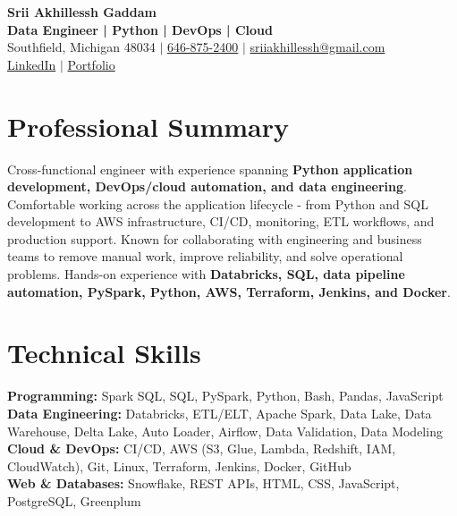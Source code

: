 \documentclass[letterpaper,10pt]{article}
\begin{document}
\fontsize{9.35pt}{10.45pt}\selectfont

\begin{center}
    {\LARGE \textbf{Srii Akhillessh Gaddam}} \\[-1pt]
    \textbf{Data Engineer | Python | DevOps | Cloud} \\[2pt]
    Southfield, Michigan 48034 $|$
    \href{tel:6468752400}{646-875-2400} $|$
    \href{mailto:sriiakhillessh@gmail.com}{sriiakhillessh@gmail.com} \\[1pt]
    \href{https://www.linkedin.com/in/srii-akhiilessh-gaddam-b48668191/}{LinkedIn} $|$
    \href{https://sriiakhillesshg.github.io/portfolio/}{Portfolio}
\end{center}
\vspace{-8pt}

\section{Professional Summary}
\small{Cross-functional engineer with experience spanning \textbf{Python application development, DevOps/cloud automation, and data engineering}. Comfortable working across the application lifecycle - from Python and SQL development to AWS infrastructure, CI/CD, monitoring, ETL workflows, and production support. Known for collaborating with engineering and business teams to remove manual work, improve reliability, and solve operational problems. Hands-on experience with \textbf{Databricks, SQL, data pipeline automation, PySpark, Python, AWS, Terraform, Jenkins, and Docker}.}

\section{Technical Skills}
\small{
\textbf{Programming:} Spark SQL, SQL, PySpark, Python, Bash, Pandas, JavaScript \\
\textbf{Data Engineering:} Databricks, ETL/ELT, Apache Spark, Data Lake, Data Warehouse, Delta Lake, Auto Loader, Airflow, Data Validation, Data Modeling \\
\textbf{Cloud \& DevOps:} CI/CD, AWS (S3, Glue, Lambda, Redshift, IAM, CloudWatch), Git, Linux, Terraform, Jenkins, Docker, GitHub \\
\textbf{Web \& Databases:} Snowflake, REST APIs, HTML, CSS, JavaScript, PostgreSQL, Greenplum
}
\end{document}
